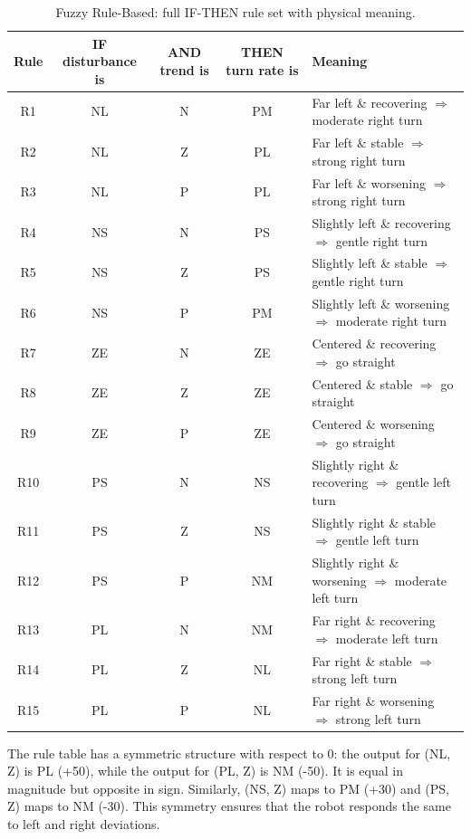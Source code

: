 \begin{table}[htbp]
\centering
\caption{Fuzzy Rule-Based: full IF-THEN rule set with physical meaning.}
\label{tab:rules-full}
\begin{tabularx}{\textwidth}{c|c|c|c|X}
\hline
\textbf{Rule} & \textbf{IF disturbance is} & \textbf{AND trend is} & \textbf{THEN turn rate is} & \textbf{Meaning} \\
\hline
R1  & NL & N & PM & Far left \& recovering $\Rightarrow$ moderate right turn \\
R2  & NL & Z & PL & Far left \& stable $\Rightarrow$ strong right turn \\
R3  & NL & P & PL & Far left \& worsening $\Rightarrow$ strong right turn \\
R4  & NS & N & PS & Slightly left \& recovering $\Rightarrow$ gentle right turn \\
R5  & NS & Z & PS & Slightly left \& stable $\Rightarrow$ gentle right turn \\
R6  & NS & P & PM & Slightly left \& worsening $\Rightarrow$ moderate right turn \\
R7  & ZE & N & ZE & Centered \& recovering $\Rightarrow$ go straight \\
R8  & ZE & Z & ZE & Centered \& stable $\Rightarrow$ go straight \\
R9  & ZE & P & ZE & Centered \& worsening $\Rightarrow$ go straight \\
R10 & PS & N & NS & Slightly right \& recovering $\Rightarrow$ gentle left turn \\
R11 & PS & Z & NS & Slightly right \& stable $\Rightarrow$ gentle left turn \\
R12 & PS & P & NM & Slightly right \& worsening $\Rightarrow$ moderate left turn \\
R13 & PL & N & NM & Far right \& recovering $\Rightarrow$ moderate left turn \\
R14 & PL & Z & NL & Far right \& stable $\Rightarrow$ strong left turn \\
R15 & PL & P & NL & Far right \& worsening $\Rightarrow$ strong left turn \\
\hline
\end{tabularx}
\end{table}

The rule table has a symmetric structure with respect to 0: the output for (NL, Z) is PL (+50), while the output for (PL, Z) is NM (-50). It is equal in magnitude but opposite in sign. Similarly, (NS, Z) maps to PM (+30) and (PS, Z) maps to NM (-30). This symmetry ensures that the robot responds the same to left and right deviations.

